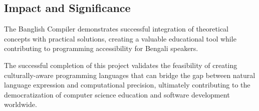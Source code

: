 \documentclass[12pt,a4paper]{article}
\begin{document}
\subsection{Impact and Significance}

The Banglish Compiler demonstrates successful integration of theoretical concepts with practical solutions, creating a valuable educational tool while contributing to programming accessibility for Bengali speakers.

\vspace{12pt}
\noindent The successful completion of this project validates the feasibility of creating culturally-aware programming languages that can bridge the gap between natural language expression and computational precision, ultimately contributing to the democratization of computer science education and software development worldwide.
\end{document}
